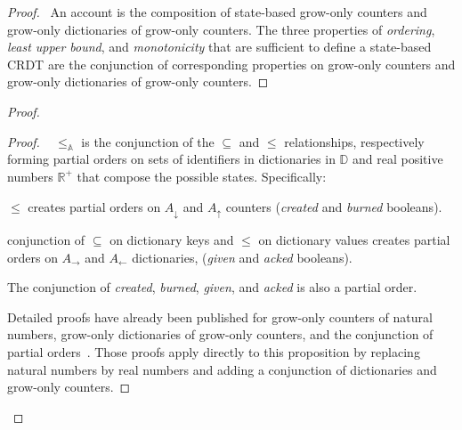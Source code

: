 \documentclass[9pt, oneside]{article}   	%
\begin{document}
\begin{proof}
	\pfsketch ~An account is the composition of state-based grow-only counters and grow-only dictionaries of grow-only counters. The three properties of \textit{ordering}, \textit{least upper bound}, and \textit{monotonicity} that are sufficient to define a state-based CRDT are the conjunction of corresponding properties on grow-only counters and grow-only dictionaries of grow-only counters.
\end{proof}

	
\begin{proof}
	\begin{proof}
		\pfsketch~ $\leq_\mathds{A}$ is the conjunction of the $\subseteq$ and $\leq$ relationships, respectively forming partial orders on sets of identifiers in dictionaries in $\mathds{D}$ and real positive numbers $\mathds{R}^+$ that compose the possible states. Specifically:
		\begin{pfenum}
			\item $\leq$ creates partial orders on $A_\downarrow$ and $A_\uparrow$ counters (\textit{created} and \textit{burned} booleans).
			\item conjunction of $\subseteq$ on dictionary keys and $\leq$ on dictionary values creates partial orders on $A_\rightarrow$ and $A_\leftarrow$ dictionaries, (\textit{given} and \textit{acked} booleans).
			\item The conjunction of \textit{created}, \textit{burned}, \textit{given}, and \textit{acked} is also a partial order.
		\end{pfenum} 		
		Detailed proofs have already been published for grow-only counters of natural numbers, grow-only dictionaries of grow-only counters, and the conjunction of partial orders~\cite{lavoie2023statebased}. Those proofs apply directly to this proposition by replacing natural numbers by real numbers and adding a conjunction of dictionaries and grow-only counters.
	\end{proof}

\end{proof}
\end{document}
